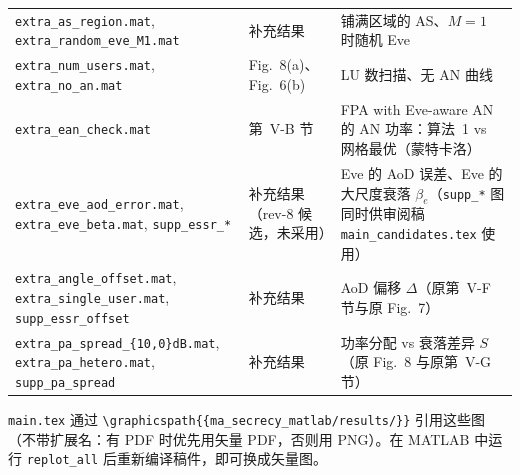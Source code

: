 \documentclass[11pt,a4paper]{ctexart}
\newcommand{\code}[1]{\texttt{#1}}
\begin{document}
\begin{center}
\begin{tabular}{p{6.0cm}p{2.6cm}p{6.6cm}}
\code{extra\_as\_region.mat}, \code{extra\_random\_eve\_M1.mat} & 补充结果 & 铺满区域的 AS、$M=1$ 时随机 Eve \\
\code{extra\_num\_users.mat}, \code{extra\_no\_an.mat} & Fig.~8(a)、Fig.~6(b) & LU 数扫描、无 AN 曲线 \\
\code{extra\_ean\_check.mat} & 第~V-B 节 & FPA with Eve-aware AN 的 AN 功率：算法~1 vs 网格最优（蒙特卡洛）\\
\code{extra\_eve\_aod\_error.mat}, \code{extra\_eve\_beta.mat}, \code{supp\_essr\_*} & 补充结果（rev-8 候选，未采用）& Eve 的 AoD 误差、Eve 的大尺度衰落 $\beta_e$（\code{supp\_*} 图同时供审阅稿 \code{main\_candidates.tex} 使用）\\
\code{extra\_angle\_offset.mat}, \code{extra\_single\_user.mat}, \code{supp\_essr\_offset} & 补充结果 & AoD 偏移 $\Delta$（原第~V-F 节与原 Fig.~7）\\
\code{extra\_pa\_spread\_\{10,0\}dB.mat}, \code{extra\_pa\_hetero.mat}, \code{supp\_pa\_spread} & 补充结果 & 功率分配 vs 衰落差异 $S$（原 Fig.~8 与原第~V-G 节）\\
\bottomrule
\end{tabular}
\end{center}
\code{main.tex} 通过 \code{\textbackslash graphicspath\{\{ma\_secrecy\_matlab/results/\}\}} 引用这些图（不带扩展名：有 PDF 时优先用矢量 PDF，否则用 PNG）。在 MATLAB 中运行 \code{replot\_all} 后重新编译稿件，即可换成矢量图。

\end{document}
